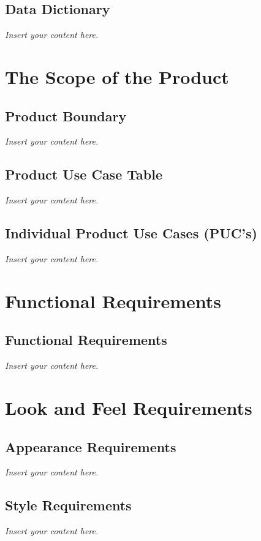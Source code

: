 \documentclass[12pt]{article}
\newcommand{\lips}{\textit{Insert your content here.}}
\begin{document}
\subsection{Data Dictionary}
\lips
\section{The Scope of the Product}
\subsection{Product Boundary}
\lips
\subsection{Product Use Case Table}
\lips
\subsection{Individual Product Use Cases (PUC's)}
\lips
\section{Functional Requirements}
\subsection{Functional Requirements}
\lips

\section{Look and Feel Requirements}
\subsection{Appearance Requirements}
\lips
\subsection{Style Requirements}
\lips
\end{document}
